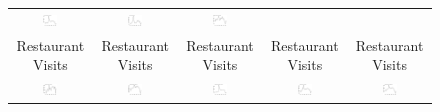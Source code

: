 \documentclass[9pt,twoside,lineno]{pnas-new}
\theoremstyle{definition}
\begin{document}
\begin{figure}[!ht]
{\begin{minipage}{\linewidth}
\begin{tabular}{c|c|c|c|c}
      \includegraphics[width=0.20\textwidth]{tables_and_figures/barPennsylvaniaCentre}&
      \includegraphics[width=0.20\textwidth]{tables_and_figures/barIowaStory}& 
      \includegraphics[width=0.20\textwidth]{tables_and_figures/barIllinoisChampaign}\\     
   Restaurant Visits  &  Restaurant Visits  & Restaurant Visits  &  Restaurant Visits  & Restaurant Visits    \\ 
      \includegraphics[width=0.20\textwidth]{tables_and_figures/restaurantArizonaPima}&
      \includegraphics[width=0.20\textwidth]{tables_and_figures/restaurantMichiganIngham}&
      \includegraphics[width=0.20\textwidth]{tables_and_figures/restaurantPennsylvaniaCentre}&
      \includegraphics[width=0.20\textwidth]{tables_and_figures/restaurantIowaStory}& 
      \includegraphics[width=0.20\textwidth]{tables_and_figures/restaurantIllinoisChampaign}\\   

\end{tabular}
\end{minipage}}
\end{figure}
\end{document}
